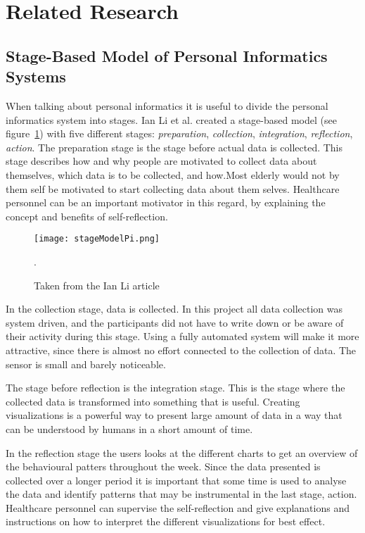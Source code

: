 \section{Related Research}

\subsection{Stage-Based Model of Personal Informatics Systems}
When talking about personal informatics it is useful to divide the personal informatics system into stages. Ian Li et al. created a stage-based model (see figure~\ref{fig:stageModelPi}) \cite{li2010} with five different stages: \emph{preparation}, \emph{collection}, \emph{integration}, \emph{reflection}, \emph{action}. The preparation stage is the stage before actual data is collected. This stage describes how and why people are motivated to collect data about themselves, which data is to be collected, and how.Most elderly would not by them self be motivated to start collecting data about them selves. Healthcare personnel can be an important motivator in this regard, by explaining the concept and benefits of self-reflection. 

\begin{figure}[h!]
	\centering
		\texttt{[image: stageModelPi.png]}
		\caption{\footnotesize Taken from the Ian Li article \cite{li2010}}.
		\label{fig:stageModelPi}
\end{figure}

In the collection stage, data is collected. In this project all data collection was system driven, and the participants did not have to write down or be aware of their activity during this stage. Using a fully automated system will make it more attractive, since there is almost no effort connected to the collection of data. The sensor is small and barely noticeable.

The stage before reflection is the integration stage. This is the stage where the collected data is transformed into something that is useful. Creating visualizations is a powerful way to present large amount of data in a way that can be understood by humans in a short amount of time. 

In the reflection stage the users looks at the different charts to get an overview of the behavioural patters throughout the week. Since the data presented is collected over a longer period it is important that some time is used to analyse the data and identify patterns that may be instrumental in the last stage, action. Healthcare personnel can supervise the self-reflection and give explanations and instructions on how to interpret the different visualizations for best effect.

